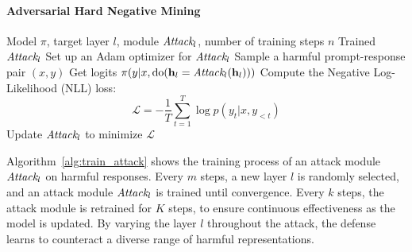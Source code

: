 \documentclass[11pt]{article}
\begin{document}
\paragraph{Adversarial Hard Negative Mining}
\label{app:adversarial_hard_neg_mining}

\begin{algorithm*}[htbp]
    \caption{Training an attack module $\attack_l$ on harmful responses}
\label{alg:train_attack}
\begin{algorithmic}[1]
\REQUIRE Model $\pi$, target layer $l$, module $\attack_l$, number of training steps $n$
\ENSURE Trained $\attack_l$
\STATE Set up an Adam optimizer for $\attack_l$
    \STATE Sample a harmful prompt-response pair $(x, y)$
    \STATE Get logits $\pi(y | x, \operatorname{do}(\textbf{h}_l = \textit{Attack}_l(\textbf{h}_l)))$
    \STATE Compute the Negative Log-Likelihood (NLL) loss:
    \[ \mathcal{L} = - \frac{1}{T} \sum_{t=1}^{T} \log p(y_t |x, y_{<t}) \]
    \STATE Update $\attack_l$ to minimize $\mathcal{L}$
\ENDFOR
\end{algorithmic}
\end{algorithm*}

Algorithm~\ref{alg:train_attack} shows the training process of an attack module $\attack_l$ on harmful responses.
Every $m$ steps, a new layer $l$ is randomly selected, and an attack module $\attack_l$ is trained until convergence.
Every $k$ steps, the attack module is retrained for $K$ steps, to ensure continuous effectiveness as the model is updated.
By varying the layer $l$ throughout the attack, the defense learns to counteract a diverse range of harmful representations.
\end{document}
